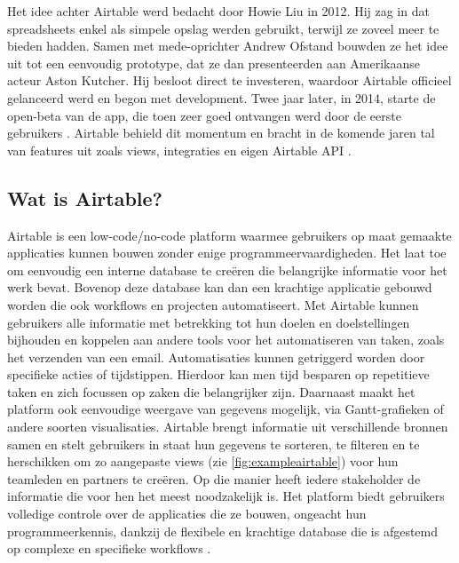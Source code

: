 Het idee achter Airtable werd bedacht door Howie Liu in 2012. Hij zag in dat spreadsheets enkel als simpele opslag werden gebruikt, terwijl ze zoveel meer te bieden hadden. Samen met mede-oprichter Andrew Ofstand bouwden ze het idee uit tot een eenvoudig prototype, dat ze dan presenteerden aan Amerikaanse acteur Aston Kutcher. Hij besloot direct te investeren, waardoor Airtable officieel gelanceerd werd en begon met development. Twee jaar later, in 2014, starte de open-beta van de app, die toen zeer goed ontvangen werd door de eerste gebruikers \autocite{Black2019}.
Airtable behield dit momentum en bracht in de komende jaren tal van features uit zoals views, integraties en eigen Airtable API \autocite{Shah}. \\

\subsection{Wat is Airtable?}
\label{subsec:wat_is_airtable}


Airtable is een low-code/no-code platform waarmee gebruikers op maat gemaakte applicaties kunnen bouwen zonder enige programmeervaardigheden. Het laat toe om eenvoudig een interne database te creëren die belangrijke informatie voor het werk bevat. Bovenop deze database kan dan een krachtige applicatie gebouwd worden die ook workflows en projecten automatiseert. Met Airtable kunnen gebruikers alle informatie met betrekking tot hun doelen en doelstellingen bijhouden en koppelen aan andere tools voor het automatiseren van taken, zoals het verzenden van een email. Automatisaties kunnen getriggerd worden door specifieke acties of tijdstippen. Hierdoor kan men tijd besparen op repetitieve taken en zich focussen op zaken die belangrijker zijn. Daarnaast maakt het platform ook eenvoudige weergave van gegevens mogelijk, via Gantt-grafieken of andere soorten visualisaties. Airtable brengt informatie uit verschillende bronnen samen en stelt gebruikers in staat hun gegevens te sorteren, te filteren en te herschikken om zo aangepaste views (zie \ref{fig:exampleairtable}) voor hun teamleden en partners te creëren. Op die manier heeft iedere stakeholder de informatie die voor hen het meest noodzakelijk is. Het platform biedt gebruikers volledige controle over de applicaties die ze bouwen, ongeacht hun programmeerkennis, dankzij de flexibele en krachtige database die is afgestemd op complexe en specifieke workflows \autocite{AirtableWhat}. \\

